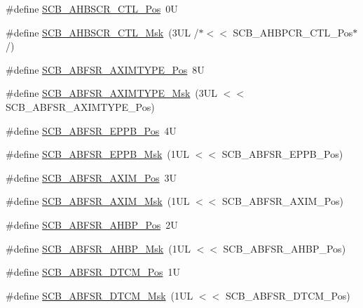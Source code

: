 \begin{DoxyCompactItemize}
\item 
\#define \hyperlink{group___c_m_s_i_s___s_c_b_gabfdcfa4029b1249d45a649ff37c04d65}{S\+C\+B\+\_\+\+A\+H\+B\+S\+C\+R\+\_\+\+C\+T\+L\+\_\+\+Pos}~0U
\item 
\#define \hyperlink{group___c_m_s_i_s___s_c_b_gab2aa81692dfec47f8b69a3f425ca1022}{S\+C\+B\+\_\+\+A\+H\+B\+S\+C\+R\+\_\+\+C\+T\+L\+\_\+\+Msk}~(3\+U\+L /$\ast$$<$$<$ S\+C\+B\+\_\+\+A\+H\+B\+P\+C\+R\+\_\+\+C\+T\+L\+\_\+\+Pos$\ast$/)
\item 
\#define \hyperlink{group___c_m_s_i_s___s_c_b_gad89888a5399f2a229270d6dc9a8eaa85}{S\+C\+B\+\_\+\+A\+B\+F\+S\+R\+\_\+\+A\+X\+I\+M\+T\+Y\+P\+E\+\_\+\+Pos}~8U
\item 
\#define \hyperlink{group___c_m_s_i_s___s_c_b_ga91783597f0721644a1ab1919755bb6ee}{S\+C\+B\+\_\+\+A\+B\+F\+S\+R\+\_\+\+A\+X\+I\+M\+T\+Y\+P\+E\+\_\+\+Msk}~(3\+U\+L $<$$<$ S\+C\+B\+\_\+\+A\+B\+F\+S\+R\+\_\+\+A\+X\+I\+M\+T\+Y\+P\+E\+\_\+\+Pos)
\item 
\#define \hyperlink{group___c_m_s_i_s___s_c_b_ga2d943581f93e2425e0a22a0d45b9f0a6}{S\+C\+B\+\_\+\+A\+B\+F\+S\+R\+\_\+\+E\+P\+P\+B\+\_\+\+Pos}~4U
\item 
\#define \hyperlink{group___c_m_s_i_s___s_c_b_gac7bbc98af76d3de2713a0eb0c6c2e613}{S\+C\+B\+\_\+\+A\+B\+F\+S\+R\+\_\+\+E\+P\+P\+B\+\_\+\+Msk}~(1\+U\+L $<$$<$ S\+C\+B\+\_\+\+A\+B\+F\+S\+R\+\_\+\+E\+P\+P\+B\+\_\+\+Pos)
\item 
\#define \hyperlink{group___c_m_s_i_s___s_c_b_ga48c7a6de20e2823c0dc74d78c5ef7992}{S\+C\+B\+\_\+\+A\+B\+F\+S\+R\+\_\+\+A\+X\+I\+M\+\_\+\+Pos}~3U
\item 
\#define \hyperlink{group___c_m_s_i_s___s_c_b_gac24348e5ec8392f4a076c7ba690aae48}{S\+C\+B\+\_\+\+A\+B\+F\+S\+R\+\_\+\+A\+X\+I\+M\+\_\+\+Msk}~(1\+U\+L $<$$<$ S\+C\+B\+\_\+\+A\+B\+F\+S\+R\+\_\+\+A\+X\+I\+M\+\_\+\+Pos)
\item 
\#define \hyperlink{group___c_m_s_i_s___s_c_b_ga5c97d4cc05972dc80963e74eb2332841}{S\+C\+B\+\_\+\+A\+B\+F\+S\+R\+\_\+\+A\+H\+B\+P\+\_\+\+Pos}~2U
\item 
\#define \hyperlink{group___c_m_s_i_s___s_c_b_gabfc67aa93bca5ddd4b0f0a47b372383e}{S\+C\+B\+\_\+\+A\+B\+F\+S\+R\+\_\+\+A\+H\+B\+P\+\_\+\+Msk}~(1\+U\+L $<$$<$ S\+C\+B\+\_\+\+A\+B\+F\+S\+R\+\_\+\+A\+H\+B\+P\+\_\+\+Pos)
\item 
\#define \hyperlink{group___c_m_s_i_s___s_c_b_ga46e22bfb92f4344807714dfa987b7cf3}{S\+C\+B\+\_\+\+A\+B\+F\+S\+R\+\_\+\+D\+T\+C\+M\+\_\+\+Pos}~1U
\item 
\#define \hyperlink{group___c_m_s_i_s___s_c_b_ga0f48b9b3b5e79c83383ff9506a75f423}{S\+C\+B\+\_\+\+A\+B\+F\+S\+R\+\_\+\+D\+T\+C\+M\+\_\+\+Msk}~(1\+U\+L $<$$<$ S\+C\+B\+\_\+\+A\+B\+F\+S\+R\+\_\+\+D\+T\+C\+M\+\_\+\+Pos)
$$
\end{DoxyCompactItemize}
